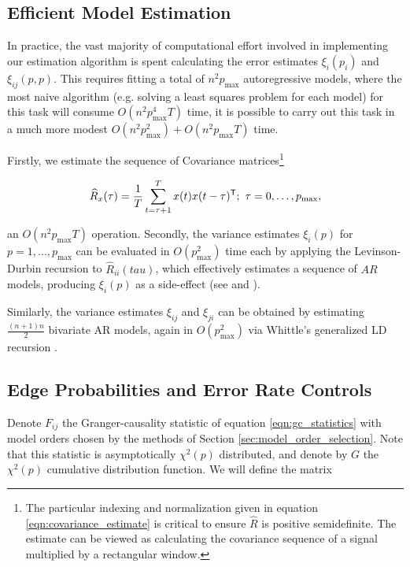 \documentclass[12pt]{article}
\begin{document}
\subsection{Efficient Model Estimation}
\label{sec:efficient_model_estimation}
In practice, the vast majority of computational effort involved in
implementing our estimation algorithm is spent calculating the error
estimates $\xi_i(p_i)$ and $\xi_{ij}(p, p)$.  This requires fitting a
total of $n^2p_{\text{max}}$ autoregressive models, where the most
naive algorithm (e.g. solving a least squares problem for each model)
for this task will consume $O(n^2p_{\text{max}}^4T)$ time, it is
possible to carry out this task in a much more modest
$O(n^2p_{\text{max}}^2 ) + O(n^2p_{\text{max}}T)$ time.

Firstly, we estimate the sequence of Covariance
matrices\footnote{The particular indexing and normalization given in
  equation \ref{eqn:covariance_estimate} is critical to ensure
  $\widehat{R}$ is positive semidefinite.  The estimate can be viewed
  as calculating the covariance sequence of a signal multiplied by a
  rectangular window.}

\begin{equation}
  \label{eqn:covariance_estimate}
  \widehat{R}_x(\tau) = \frac{1}{T}\sum_{t = \tau + 1}^T x(t) x(t - \tau)^{\mathsf{T}};\ \tau = 0, \ldots, p_{\text{max}},
\end{equation}

an $O(n^2p_{\text{max}}T)$ operation.  Secondly, the variance
estimates $\xi_i(p)$ for $p = 1, \ldots, p_{\text{max}}$ can be
evaluated in $O(p_{\text{max}}^2)$ time each by applying the
Levinson-Durbin recursion to $\widehat{R}_{ii}(tau)$, which
effectively estimates a sequence of $AR$ models, producing $\xi_i(p)$
as a side-effect (see
\cite{hayes_statistical_digital_signal_processing} and
\cite{levinson_durbin_recursion}).

Similarly, the variance estimates $\xi_{ij}$ and $\xi_{ji}$ can be
obtained by estimating $\frac{(n + 1)n}{2}$ bivariate AR models, again
in $O(p_{\text{max}}^2)$ via Whittle's generalized LD recursion
\cite{whittle_generalized_levinson_durbin}.


\subsection{Edge Probabilities and Error Rate Controls}
Denote $F_{ij}$ the Granger-causality statistic of equation
\ref{eqn:gc_statistics} with model orders chosen by the methods of
Section \ref{sec:model_order_selection}.  Note that this statistic is
asymptotically $\chi^2(p)$ distributed, and denote by $G$ the
$\chi^2(p)$ cumulative distribution function.  We will define the matrix
\end{document}
